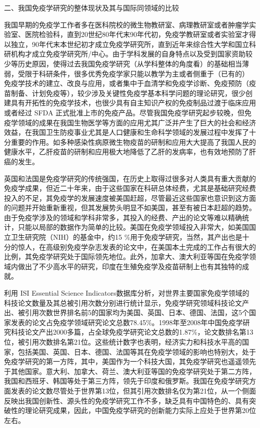 \begin{center}
{\large 二、我国免疫学研究的整体现状及其与国际同领域的比较}
\end{center}

我国早期的免疫学工作者多在医科院校的微生物教研室、病理教研室或者肿瘤学实验室、医院检验科，直到20世纪80年代末90年代初，免疫学教研室或者实验室才得以独立，90年代末本世纪初才成立免疫学研究所，直到近年来综合性大学和国立科研机构才成立免疫学研究所/中心。由于学科发展的自身特点以及受到国家资助较少等历史原因，使得过去我国免疫学研究（从学科整体的角度看）的基础相当薄弱，受限于科研条件，很多优秀免疫学家只能以教学为主或者侧重于（已有的）
免疫学技术的建立、改良与应用，或者集中于血清学和免疫学诊断、免疫预防（疫苗制备、计划免疫等），较少涉及关键性免疫学基本科学问题的理论研究，很少创建具有开拓性的免疫学技术，也很少具有自主知识产权的免疫制品过渡于临床应用或者经过
SFDA
正式批准上市的免疫产品。尽管我国免疫学研究起步较晚，但免疫学领域的成果在我国生物医学等方面的应用尤其广泛并产生了巨大的社会和经济效益，在我国卫生防疫事业尤其是人口健康和生命科学领域的发展过程中发挥了十分重要的作用。如多种感染性病原微生物疫苗的研制和应用大大提高了我国人民的健康水平，乙肝疫苗的研制和应用极大地降低了乙肝的发病率，也有效地预防了肝癌的发生。

英国和法国是免疫学研究的传统强国，在历史上取得过很多对人类具有重大贡献的免疫学成果，但近二十年来，由于这些国家在科研总体经费，尤其是基础研究经费投入的不足，其免疫学的发展速度被美国赶超，尽管最近这些国家也意识到这方面的问题并开始重新重视，但其发展势头明显不如美国，甚至有被日本赶超的趋势。由于免疫学涉及的领域和学科非常多，其投入的经费、产出的论文等难以精确统计，只能以局部的数据作为简单的比较。美国在免疫学领域投入非常大，如美国国立卫生研究院（NIH）的基金中，约15
\%用于免疫学研究，当然，其产出也是十分的惊人，在高级别免疫学杂志发表的论文中，在美国本土完成的工作占有很大的比例，其免疫学研究处于国际领先地位。此外，加拿大、澳大利亚等国在免疫学领域内做出了不少高水平的研究，印度在生殖免疫学及疫苗研制上也有其独特的成就。

利用 ISI Essential Science
Indicators数据库分析，对世界主要国家免疫学领域的科技论文数量及其总被引用次数分别进行统计显示，免疫学研究领域科技论文产出、被引用次数世界排名前5的国家均为美国、英国、日本、德国、法国，这5个国家发表的论文占免疫学领域研究论文总数78.45\%。1998年至2008年中国免疫学研究科技论文产出2000多篇，占全球免疫学研究论文总数的1.87\%，论文数排名第13位，被引用次数排名第21位。这些统计数字也表明，经济实力和科技水平高的国家，包括美国、英国、日本、德国、法国等其在免疫学领域的影响也特别大，处于免疫学研究的第一方阵，其中，美国作为一个科技大国，其免疫学研究也遥遥领先于其他国家。意大利、加拿大、荷兰、澳大利亚等国的免疫学研究处于第二方阵，我国和西班牙、韩国等处于第三方阵，领先于印度和俄罗斯。我国在免疫学研究方面发表的论文数尽管处于世界第13位，但其引用次数排名仅为第21位，从一个侧面反映出我国创新性、源头性的免疫学研究工作不多，缺乏具有中国特色的、具有突破性的理论研究成果，因此，中国免疫学研究的创新能力实际上应处于世界第20位左右。

